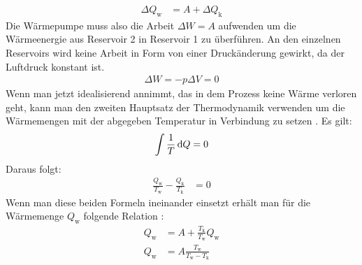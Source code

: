 \begin{align}
    \Delta Q_\text{w}    &= A + \Delta Q_\text{k} %
\end{align}
%
Die Wärmepumpe muss also die Arbeit $\Delta W = A$ aufwenden um die Wärmeenergie aus Reservoir 2 in Reservoir 1 zu überführen.
An den einzelnen Reservoirs wird keine Arbeit in Form von einer Druckänderung gewirkt, da der Luftdruck konstant ist.
\begin{align*}
    \Delta W = - p \Delta V = 0 
\end{align*}
Wenn man jetzt idealisierend annimmt, das in dem Prozess keine Wärme verloren geht, kann man den zweiten Hauptsatz der Thermodynamik
verwenden um die Wärmemengen mit der abgegeben Temperatur in Verbindung zu setzen \cite[vgl.][1]{man:v206}. 
Es gilt:
\begin{align*}
    \int \frac{1}{T} \diff Q = 0 %
\end{align*}
Daraus folgt:
\begin{align}
    \frac{Q_\text{w}}{T_\text{w}} - \frac{Q_\text{k}}{T_\text{k}} &= 0
\end{align}
Wenn man diese beiden Formeln ineinander einsetzt erhält man für die Wärmemenge $Q_\text{w}$ folgende Relation \cite{man:v206}: 
\begin{align}
\nonumber    Q_\text{w} &= A + \frac{T_\text{k}}{T_\text{w}}Q_\text{w} \\
    Q_\text{w} &= A \frac{T_\text{w}}{T_\text{w} - T_\text{k}}
\end{align}
